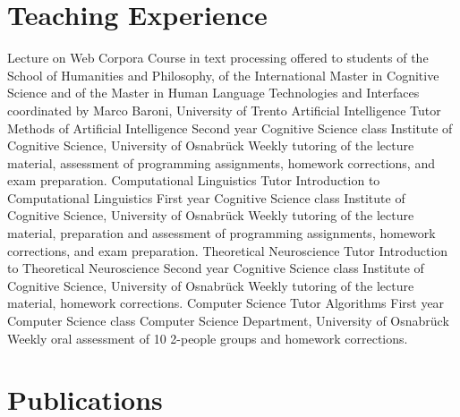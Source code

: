 \documentclass[11pt,a4paper]{moderncv}
\begin{document}
\section{Teaching Experience}
        {Lecture on Web Corpora}
        {Course in text processing}
        {offered to students of the School of Humanities and Philosophy, of the
        International Master in Cognitive Science and of the Master in Human
        Language Technologies and Interfaces}
        {coordinated by Marco Baroni, University of Trento}
        {}
        {Artificial Intelligence Tutor}
        {Methods of Artificial Intelligence}
        {Second year Cognitive Science class}
        {Institute of Cognitive Science, University of Osnabr\"{u}ck}
        {Weekly tutoring of the lecture material, assessment of programming
        assignments, homework corrections, and exam preparation.}	
        {Computational Linguistics Tutor}
        {Introduction to Computational Linguistics}
        {First year Cognitive Science class}
        {Institute of Cognitive Science, University of Osnabr\"{u}ck}
        {Weekly tutoring of the lecture material, preparation and assessment of
        programming assignments, homework corrections, and exam preparation.}
        {Theoretical Neuroscience Tutor}
        {Introduction to Theoretical Neuroscience}
        {Second year Cognitive Science class}
        {Institute of Cognitive Science, University of Osnabr\"{u}ck}
        {Weekly tutoring of the lecture material, homework corrections.}
        {Computer Science Tutor}
        {Algorithms}
        {First year Computer Science class}
        {Computer Science Department, University of Osnabr\"{u}ck}
        {Weekly oral assessment of 10 2-people groups and homework corrections.}
\closesection{}



%
%

\section{Publications}
\end{document}
